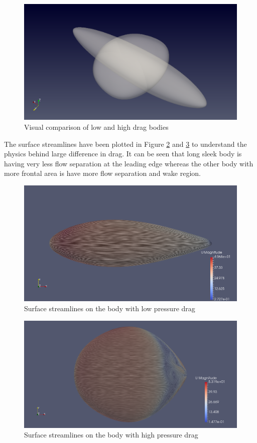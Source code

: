 \begin{figure}[H]
	\centering
	\includegraphics[width=300 pt]{rnd/visual_low_high.png}
	\caption{Visual comparison of low and high drag bodies}
	\label{visual comparison} %
\end{figure}

The surface streamlines have been plotted in Figure \ref{low drag body} and \ref{high drag body} to understand the physics behind large difference in drag. It can be seen that long sleek body is having very less flow separation at the leading edge whereas the other body with more frontal area is have more flow separation and wake region.

\begin{figure}[H]
	\centering
	\includegraphics[width=300 pt]{rnd/streamlines_25_l.png}
	\caption{Surface streamlines on the body with low pressure drag}
	\label{low drag body} %
\end{figure}

\begin{figure}[H]
	\centering
	\includegraphics[width=300 pt]{rnd/streamlines_45.png}
	\caption{Surface streamlines on the body with high pressure drag}
	\label{high drag body} %
\end{figure}

